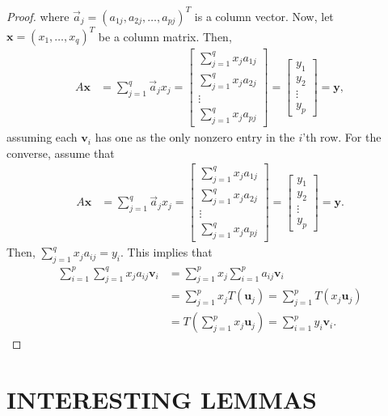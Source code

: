\documentclass[12pt]{article}
\begin{document}
\begin{proof}
where $\vec{a}_{j} = (a_{1j},a_{2j},\dots,a_{pj})^{T}$ is a column vector.
Now, let $\mathbf{x} = (x_{1},\dots,x_{q})^{T}$ be a column matrix. Then,
\begin{align*}
  A\mathbf{x} &= \sum_{j=1}^{q} \vec{a}_{j}x_{j} =    
\begin{bmatrix}
  \sum_{j=1}^{q}x_{j}a_{1j} \\ \sum_{j=1}^{q}x_{j}a_{2j} \\ \vdots \\ \sum_{j=1}^{q}x_{j}a_{pj}
\end{bmatrix}
=
\begin{bmatrix}
  y_{1} \\ y_{2} \\ \vdots \\ y_{p}
\end{bmatrix}
= \mathbf{y},
\end{align*}
assuming each $\mathbf{v}_{i}$ has one as the only nonzero entry in the $i$'th row. For the converse, assume that  
\begin{align*}
  A\mathbf{x} &= \sum_{j=1}^{q} \vec{a}_{j}x_{j} =    
\begin{bmatrix}
  \sum_{j=1}^{q}x_{j}a_{1j} \\ \sum_{j=1}^{q}x_{j}a_{2j} \\ \vdots \\ \sum_{j=1}^{q}x_{j}a_{pj}
\end{bmatrix}
=
\begin{bmatrix}
  y_{1} \\ y_{2} \\ \vdots \\ y_{p}
\end{bmatrix}
= \mathbf{y}.
\end{align*}
Then, $\sum_{j=1}^{q} x_{j}a_{ij} = y_{i}$. This implies that 
\begin{align*}
  \sum_{i=1}^{p}\sum_{j=1}^{q} x_{j}a_{ij} \mathbf{v}_{i} &=  \sum_{j=1}^{p}x_{j}\sum_{i=1}^{p} a_{ij}\mathbf{v}_{i} \\
  &= \sum_{j=1}^{p} x_{j}T(\mathbf{u}_{j}) = \sum_{j=1}^{p}T(x_{j}\mathbf{u}_{j})\\
  &= T\left( \sum_{j=1}^{p} x_{j}\mathbf{u}_{j} \right) = \sum_{i=1}^{p} y_{i} \mathbf{v}_{i}.
\end{align*}
\end{proof}
\section{INTERESTING LEMMAS}
\end{document}
